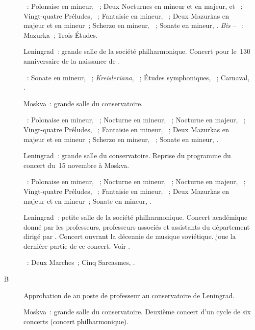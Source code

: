 \begin{description}
 \textsc{\Chopin{}}~: Polonaise en \kC mineur,  ~; Deux
 Nocturnes en \kC mineur et en \kF majeur,   et 
 ~; Vingt-quatre Préludes, ~; Fantaisie en \kF mineur,
 ~; Deux Mazurkas en \kC majeur et en \kF mineur~; Scherzo en \kB
 mineur, ~; Sonate en \kB \Flat mineur, .
 \emph{Bis} -- \textsc{\Chopin{}}~: Mazurka~; Trois Études.
 \item[\DateWithWeekDay{1939-10-31}]
 Leningrad~: grande salle de la société philharmonique.
 Concert pour le~130\ieme{} anniversaire de la naissance de \Schumann{}.

 \textsc{\Schumann{}}~: Sonate en \kF mineur, ~;
 \emph{Kreisleriana}, ~; Études symphoniques, ~; Carnaval,
 .
 \item[\DateWithWeekDay{1939-11-15}]
 Moskva~: grande salle du conservatoire.

 \textsc{\Chopin{}}~: Polonaise en \kC mineur,  ~;
 Nocturne en \kC mineur,  ~; Nocturne en \kF majeur,
  ~; Vingt-quatre Préludes, ~; Fantaisie en \kF
 mineur, ~; Deux Mazurkas en \kC majeur et en \kF mineur~; Scherzo
 en \kB \Flat mineur, ~; Sonate en \kB \Flat mineur, .
 \item[\DateWithWeekDay{1939-12-02}]
 Leningrad~: grande salle du conservatoire.
 Reprise du programme du concert du~15 novembre à Moskva.

 \textsc{\Chopin{}}~: Polonaise en \kC mineur,  ~;
 Nocturne en \kC mineur,  ~; Nocturne en \kF majeur,
  ~; Vingt-quatre Préludes, ~; Fantaisie en \kF
 mineur, ~; Deux Mazurkas en \kC majeur et en \kF mineur~; Sonate
 en \kB \Flat mineur, .
 \item[\DateWithWeekDay{1939-12-07}]
 Leningrad~: petite salle de la société philharmonique.
 Concert académique donné par les professeurs, professeurs associés et
 assistants du département dirigé par \LNikolaiev{}.
 Concert ouvrant la décennie de musique soviétique.
 \VSofronitsky{} joue la dernière partie de ce concert.
 Voir \citet[p.~161]{Nekrasova08}.

 \textsc{\Prokofiev{}}~: Deux Marches~; Cinq Sarcasmes, .
 \item[B\DateWithWeekDay{1939-12-17}]
 Approbation de \VSofronitsky{} au poste de professeur au conservatoire de
 Leningrad.
 \item[\DateWithWeekDay{1939-12-25}]
 Moskva~: grande salle du conservatoire.
 Deuxième concert d'un cycle de six concerts (concert philharmonique).


\end{description}
